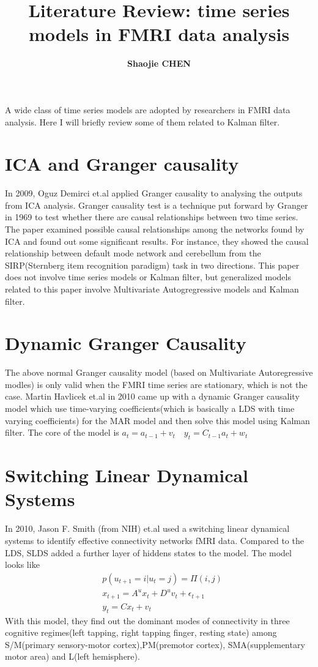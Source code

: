 \documentclass[fleqn]{article}
\begin{document}
\title{Literature Review: time series models in FMRI data analysis}
\author{\bf{Shaojie CHEN}}
\maketitle
A wide class of time series models are adopted by researchers in FMRI data analysis. Here I will briefly review some of them related to Kalman filter.
\section{ICA and Granger causality}
In 2009, Oguz Demirci et.al applied Granger causality to analysing the outputs from ICA analysis. Granger causality test is a technique put forward by Granger in 1969 to test whether there are causal relationships between two time series. The paper examined possible causal relationships among the networks found by ICA and found out some significant results. For instance, they showed the causal relationship between default mode network and cerebellum from
the SIRP(Sternberg item recognition paradigm) task in two directions. This paper does not involve time series models or Kalman filter, but generalized models related to this paper involve Multivariate Autogregressive models and Kalman filter.
\section{Dynamic Granger Causality}
The above normal Granger causality model (based on Multivariate Autoregressive modles) is only valid when the FMRI time series are stationary, which is not the case. Martin Havlicek et.al in 2010 came up with a dynamic Granger causality model which use time-varying coefficients(which is basically a LDS with time varying coefficients) for the MAR model and then solve this model using Kalman filter. The core of the model is $a_t=a_{t-1}+v_t\quad y_t=C_{t-1}a_t+w_t$
\section{Switching Linear Dynamical Systems}
In 2010, Jason F. Smith (from NIH) et.al used a switching linear dynamical systems to identify effective connectivity networks fMRI data. Compared to the LDS, SLDS added a further layer of hiddens states to the model. The model looks like
\begin{align*}
&p(u_{t+1}=i|u_t=j)=\Pi(i,j)\\
&x_{t+1}=A^ux_t+D^uv_t+\epsilon_{t+1}\\
&y_t=Cx_t+v_t
\end{align*}
With this model, they find out the dominant modes of connectivity in three cognitive regimes(left tapping, right tapping finger, resting state) among S/M(primary sensory-motor cortex),PM(premotor cortex), SMA(supplementary motor area) and L(left hemisphere).
\end{document}
